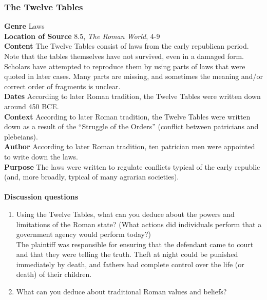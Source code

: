 \documentclass{article}
\begin{document}
\subsubsection*{The Twelve Tables}
\textbf{Genre}
Laws \\
\textbf{Location of Source}
8.5, \textit{The Roman World}, 4-9 \\
\textbf{Content}
The Twelve Tables consist of laws from the early republican period.  Note that the tables
themselves have not survived, even in a damaged form.  Scholars have attempted to
reproduce them by using parts of laws that were quoted in later cases.  Many parts are
missing, and sometimes the meaning and/or correct order of fragments is unclear. \\
\textbf{Dates}
According to later Roman tradition, the Twelve Tables were written down around 450 BCE. \\
\textbf{Context}
According to later Roman tradition, the Twelve Tables were written down as a result of the
“Struggle of the Orders” (conflict between patricians and plebeians). \\
\textbf{Author}
According to later Roman tradition, ten patrician men were appointed to write down the laws. \\
\textbf{Purpose}
The laws were written to regulate conflicts typical of the early republic (and, more broadly,
typical of many agrarian societies). \\
\\
\textbf{Discussion questions}
\begin{enumerate}
  \item Using the Twelve Tables, what can you deduce about the powers and limitations
  of the Roman state?  (What actions did individuals perform that a government agency
  would perform today?) \\
  The plaintiff was responsible for ensuring that the defendant came to court and that they were telling
  the truth. Theft at night could be punished immediately by death, and fathers had complete
  control over the life (or death) of their children.
  \item What can you deduce about traditional Roman values and beliefs?
\end{enumerate}
\end{document}
